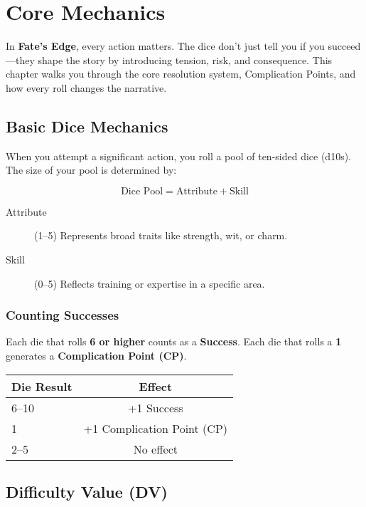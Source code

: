 
\chapter{Core Mechanics}

In \textbf{Fate's Edge}, every action matters. The dice don't just tell you if you succeed—they shape the story by introducing tension, risk, and consequence. This chapter walks you through the core resolution system, Complication Points, and how every roll changes the narrative.

\section{Basic Dice Mechanics}

When you attempt a significant action, you roll a pool of ten-sided dice (d10s). The size of your pool is determined by:

\[
\text{Dice Pool} = \text{Attribute} + \text{Skill}
\]

\begin{description}
  \item[Attribute] (1–5) Represents broad traits like strength, wit, or charm.
  \item[Skill] (0–5) Reflects training or expertise in a specific area.
\end{description}

\subsection*{Counting Successes}

Each die that rolls \textbf{6 or higher} counts as a \textbf{Success}. Each die that rolls a \textbf{1} generates a \textbf{Complication Point (CP)}.

\begin{center}
\begin{tabular}{lc}
\toprule
\textbf{Die Result} & \textbf{Effect} \\
\midrule
6–10 & +1 Success \\
1 & +1 Complication Point (CP) \\
2–5 & No effect \\
\bottomrule
\end{tabular}
\end{center}

\section{Difficulty Value (DV)}

